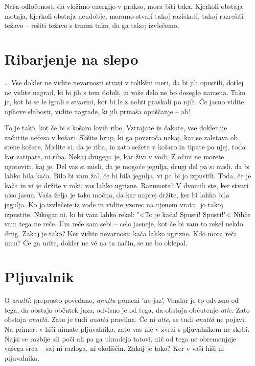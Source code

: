 Naša odločenost, da vložimo energijo v prakso, mora biti taka. Kjerkoli obstaja motnja, kjerkoli obstaja neudobje, moramo stvari takoj raziskati, takoj razrešiti težavo – rešiti težavo s trnom tako, da ga takoj izvlečemo.

\section{Ribarjenje na slepo}

\ldots{} Vse dokler ne vidite nevarnosti stvari v tolikšni meri, da bi jih opustili, dotlej ne vidite nagrad, ki bi jih s tem dobili, in vaše delo ne bo doseglo namena. Tako je, kot bi se le igrali s stvarmi, kot bi le z nohti praskali po njih. Če jasno vidite njihove slabosti, vidite nagrade, ki jih prinaša opuščanje – ah!

To je tako, kot če bi s košaro lovili ribe. Vztrajate in čakate, vse dokler ne začutite nečesa v košari. Slišite hrup, ki ga povzroča nekaj, kar se zaletava ob stene košare. Mislite si, da je riba, in zato sežete v košaro in tipate po njej, toda kar zatipate, ni riba. Nekaj drugega je, kar živi v vodi. Z očmi ne morete ugotoviti, kaj je. Del vas si misli, da je mogoče jegulja, drugi del pa si misli, da bi lahko bila kača. Bilo bi vam žal, če bi bila jegulja, vi pa bi jo izpustili. Toda, če je kača in vi jo držite v roki, vas lahko ugrizne. Razumete? V dvomih ste, ker stvari niso jasne. Vaša želja je tako močna, da kar naprej držite, ker bi lahko bila jegulja. Ko jo izvlečete iz vode in vidite vzorec na njenem vratu, jo takoj izpustite. Nikogar ni, ki bi vam lahko rekel: "<To je kača! Spusti! Spusti!"< Nihče vam tega ne reče. Um reče sam sebi – celo jasneje, kot če bi vam to rekel nekdo drug. Zakaj je tako? Ker vidite nevarnost: kača lahko ugrizne. Kdo mora reči umu? Če ga urite, dokler ne vé na ta način, se ne bo oklepal.

\section{Pljuvalnik}

O \emph{anatti}: preprosto povedano, \emph{anatta} pomeni 'ne-jaz'. Vendar je to odvisno od tega, da obstaja občutek jaza; odvisno je od tega, da obstaja občutenje \emph{atte}. Zato obstaja \emph{anattā}. Zato je tudi \emph{anattā} pravilna. Če ni \emph{atte}, se tudi \emph{anattā} ne pojavi. Na primer: v hiši nimate pljuvalnika, zato vas nič v zvezi s pljuvalnikom ne skrbi. Najsi se razbije ali poči ali pa ga ukradejo tatovi, nič od tega ne obremenjuje vašega srca – saj ni razloga, ni okoliščin. Zakaj je tako? Ker v vaši hiši ni pljuvalnika.

